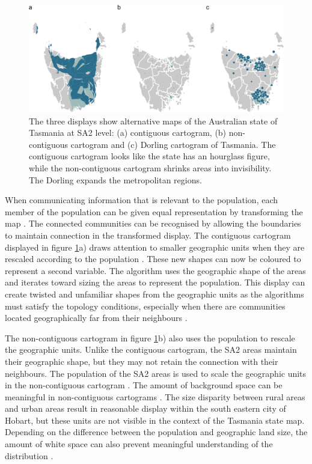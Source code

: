 \begin{Schunk}
\begin{figure}
\includegraphics[width=0.95\linewidth]{kobakian-cook_files/figure-latex/tas_displays-1} \caption[The three displays show alternative maps of the Australian state of Tasmania at SA2 level]{The three displays show alternative maps of the Australian state of Tasmania at SA2 level: (a) contiguous cartogram, (b) non-contiguous cartogram and (c) Dorling cartogram of Tasmania. The contiguous cartogram looks like the state has an hourglass figure, while the non-contiguous cartogram shrinks areas into invisibility. The Dorling expands the metropolitan regions.}\label{fig:tas_displays}
\end{figure}
\end{Schunk}

When communicating information that is relevant to the population, each
member of the population can be given equal representation by
transforming the map \citep{TVSSS}. The connected communities can be
recognised by allowing the boundaries to maintain connection in the
transformed display. The contiguous cartogram displayed in figure
\ref{fig:tas_displays}a) draws attention to smaller geographic units
when they are rescaled according to the population \citep{DMAHP}. These
new shapes can now be coloured to represent a second variable. The
algorithm uses the geographic shape of the areas and iterates toward
sizing the areas to represent the population. This display can create
twisted and unfamiliar shapes from the geographic units as the
algorithms must satisfy the topology conditions, especially when there
are communities located geographically far from their neighbours
\citep{TVSSS}.

The non-contiguous cartogram in figure \ref{fig:tas_displays}b) also
uses the population to rescale the geographic units. Unlike the
contiguous cartogram, the SA2 areas maintain their geographic shape, but
they may not retain the connection with their neighbours. The population
of the SA2 areas is used to scale the geographic units in the
non-contiguous cartogram \citep{NAC}. The amount of background space can
be meaningful in non-contiguous cartograms \citep{ECGC}. The size
disparity between rural areas and urban areas result in reasonable
display within the south eastern city of Hobart, but these units are not
visible in the context of the Tasmania state map. Depending on the
difference between the population and geographic land size, the amount
of white space can also prevent meaningful understanding of the
distribution \citep{TVSSS}.


